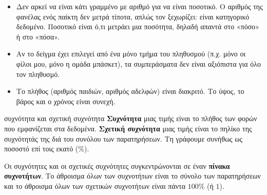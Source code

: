 \begin{center}
\end{center}

\begin{prosoxi}
\begin{itemize}[leftmargin=1.2em,itemsep=0.3ex,topsep=2pt]
\item Δεν αρκεί να είναι κάτι γραμμένο με αριθμό για να είναι ποσοτικό. Ο αριθμός της φανέλας ενός παίκτη δεν μετρά τίποτα, απλώς τον ξεχωρίζει: είναι κατηγορικό δεδομένο. Ποσοτικό είναι ό,τι μετράει μια ποσότητα, δηλαδή απαντά στο «πόσο» ή στο «πόσα».
\item Αν το δείγμα έχει επιλεγεί από ένα μόνο τμήμα του πληθυσμού (π.χ. μόνο οι φίλοι μου, μόνο η ομάδα μπάσκετ), τα συμπεράσματα δεν είναι αξιόπιστα για όλο τον πληθυσμό.
\item Το πλήθος (αριθμός παιδιών, αριθμός αδελφών) είναι διακριτό. Το ύψος, το βάρος και ο χρόνος είναι συνεχή.
\end{itemize}
\end{prosoxi}

\begin{orismos}{συχνότητα και σχετική συχνότητα}
\textbf{Συχνότητα} μιας τιμής είναι το πλήθος των φορών που εμφανίζεται στα δεδομένα. \textbf{Σχετική συχνότητα} μιας τιμής είναι το πηλίκο της συχνότητάς της διά του συνόλου των παρατηρήσεων. Τη γράφουμε συνήθως ως ποσοστό επί τοις εκατό ($\%$).
\end{orismos}

Οι συχνότητες και οι σχετικές συχνότητες συγκεντρώνονται σε έναν \textbf{πίνακα συχνοτήτων}. Το άθροισμα όλων των συχνοτήτων είναι το σύνολο των παρατηρήσεων και το άθροισμα όλων των σχετικών συχνοτήτων είναι πάντα $100\%$ (ή $1$).

